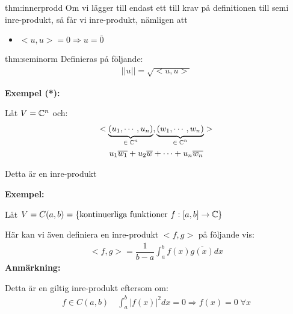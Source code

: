 \begin{theo}{thm:innerprodd}
  Om vi lägger till endast ett till krav på definitionen till semi inre-produkt, så får vi inre-produkt, nämligen att\par
  \begin{itemize}
    \item $<u,u> = 0\Rightarrow u = \overline{0}$
  \end{itemize}
\end{theo}
\par\bigskip
\begin{theo}{thm:seminorm}
  Definieras på följande:
  \begin{equation*}
    \begin{gathered}
      \left|\left|u\right|\right| = \sqrt{<u,u>}
    \end{gathered}
  \end{equation*}
\end{theo}
\par\bigskip
\noindent\textbf{Exempel (*):}\par
\noindent Låt $V = \mathbb{C}^n$ och:
\begin{equation*}
  \begin{gathered}
    <\underbrace{(u_1,\cdots,u_n)}_{\text{$\in\mathbb{C}^n$}},\underbrace{(w_1,\cdots,w_n)}_{\text{$\in \mathbb{C}^n$}}>\\
    u_1\overline{w_1}+u_2\overline{w}+\cdots+u_n\overline{w_n}
  \end{gathered}
\end{equation*}\par
\noindent Detta är en inre-produkt
\par\bigskip
\noindent\textbf{Exempel:}\par
\noindent Låt $V = C(a,b) = \left\{\text{kontinuerliga funktioner } f:[a,b]\to\mathbb{C}\right\}$\par
\noindent Här kan vi även definiera en inre-produkt $<f,g>$ på följande vis:
\begin{equation*}
  \begin{gathered}
    <f,g> = \dfrac{1}{b-a}\int_{a}^{b}f(x)\overline{g(x)}dx
  \end{gathered}
\end{equation*}
\newpage
\noindent\textbf{Anmärkning:}\par
\noindent Detta är en giltig inre-produkt eftersom om:
\begin{equation*}
  \begin{gathered}
    f\in C(a,b)\quad \int_{a}^{b}\left|f(x)\right|^2dx = 0\Rightarrow f(x) = 0\;\forall x
  \end{gathered}
\end{equation*}
